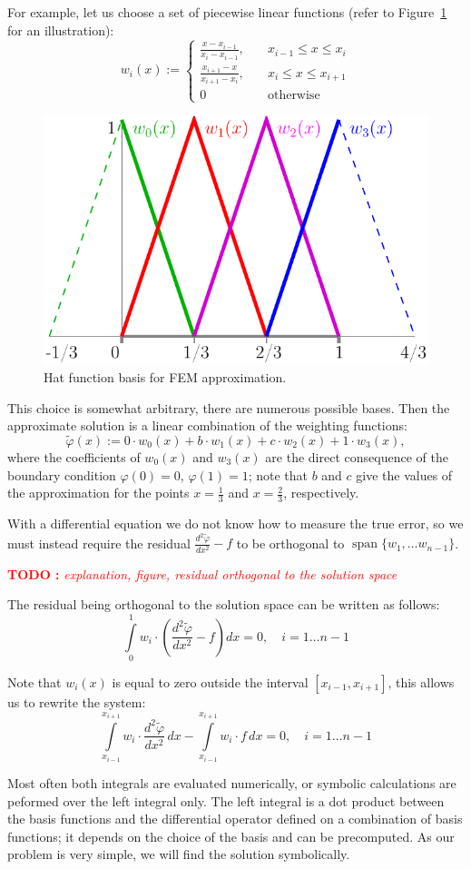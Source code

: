 \documentclass[notitlepage]{report}
\DeclareMathOperator{\Span}{span}
\newcommand\TODO[1]{\textcolor{red}{{\bf TODO :} \it #1}}
\begin{document}
For example, let us choose a set of piecewise linear functions (refer to Figure~\ref{fig:fem:blending} for an illustration):
$$
w_i(x) := \left\{
\begin{split}
\frac{x-x_{i-1}}{x_i-x_{i-1}}, & \quad x_{i-1}\leq x \leq x_i \\
\frac{x_{i+1}-x}{x_{i+1}-x_i}, & \quad x_i\leq x \leq x_{i+1}\\
0 & \quad \text{otherwise}
\end{split}
\right.
$$

\begin{figure}[ht]
	\centering
	\includegraphics[width=.3\linewidth]{blending_functions.pdf}
	\caption{Hat function basis for FEM approximation.}
	\label{fig:fem:blending}
\end{figure}

This choice is somewhat arbitrary, there are numerous possible bases.
Then the approximate solution is a linear combination of the weighting functions:
$$
\tilde{\varphi}(x) := 0\cdot w_0(x) + b\cdot w_1(x) + c\cdot w_2(x) + 1\cdot w_3(x),
$$
where the coefficients of $w_0(x)$ and $w_3(x)$ are the direct consequence of the boundary condition $\varphi(0)=0$, $\varphi(1)=1$;
note that $b$ and $c$ give the values of the approximation for the points $x=\frac{1}{3}$ and $x=\frac{2}{3}$, respectively.

With a differential equation we do not know how to measure the true error, 
so we must instead require the residual $\frac{d^2\tilde{\varphi}}{dx^2} - f$ to be orthogonal to $\Span\{w_1,\dots w_{n-1}\}$.

\TODO{explanation, figure, residual orthogonal to the solution space}


The residual being orthogonal to the solution space can be written as follows:
$$
\int\limits_0^1 w_i \cdot \left(\frac{d^2\tilde{\varphi}}{dx^2} - f\right) dx = 0, \quad i = 1\dots n-1 
$$

Note that $w_i(x)$ is equal to zero outside the interval $[x_{i-1}, x_{i+1}]$, this allows us to rewrite the system:
$$
\int\limits_{x_{i-1}}^{x_{i+1}} w_i \cdot \frac{d^2\tilde{\varphi}}{dx^2}\,dx - \int\limits_{x_{i-1}}^{x_{i+1}} w_i\cdot f\,dx = 0, \quad i = 1\dots n-1
$$

Most often both integrals are evaluated numerically, or symbolic calculations are peformed over the left integral only.
The left integral is a dot product between the basis functions and the differential operator defined on a combination of basis functions;
it depends on the choice of the basis and can be precomputed.
As our problem is very simple, we will find the solution symbolically.
\end{document}
